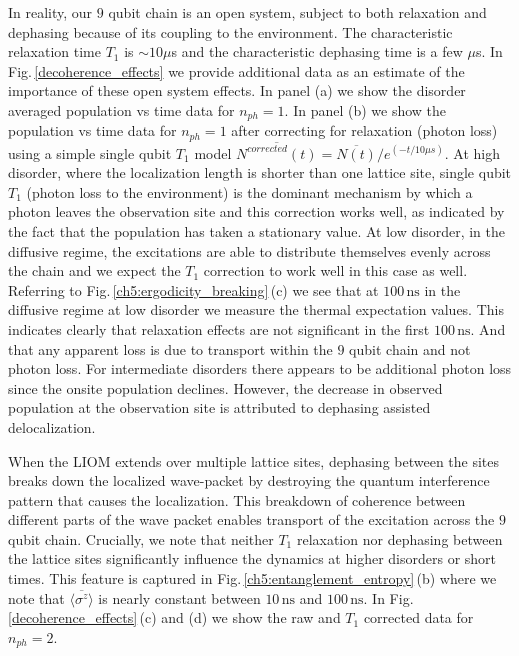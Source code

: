 In reality, our $9$ qubit chain is an open system, subject to both relaxation and dephasing because of its coupling to the environment.
The characteristic relaxation time $T_1$ is $\sim 10 \mu$s and the characteristic dephasing time is a few $\mu$s.
In Fig.\,\ref{decoherence_effects} we provide additional data as an estimate of the importance of these open system effects.
In panel (a) we show the disorder averaged population vs time data for $n_{ph}=1$.
In panel (b) we show the population vs time data for $n_{ph}=1$ after correcting for relaxation (photon loss) using a simple single qubit $T_1$ model
$\overline{N^{corrected} \left( t \right)} = \overline{N \left( t \right)} / e^{\left( -t/10 \mu s \right) }$.
%
At high disorder, where the localization length is shorter than one lattice site,
single qubit $T_1$ (photon loss to the environment) is the dominant mechanism by which a photon leaves the observation site and this correction works well,
as indicated by the fact that the population has taken a stationary value.
%
At low disorder, in the diffusive regime, the excitations are able to distribute themselves evenly across the chain and we expect the $T_1$ correction to work well in this case as well.
Referring to Fig.\,\ref{ch5:ergodicity_breaking}\,(c) we see that at $100 \, \text{ns}$ in the diffusive regime at low disorder we measure the thermal expectation values.
This indicates clearly that relaxation effects are not significant in the first $100 \, \text{ns}$.
And that any apparent loss is due to transport within the $9$ qubit chain and not photon loss.
%
For intermediate disorders there appears to be additional photon loss since the onsite population declines. However, the decrease in observed population at the observation site is attributed to dephasing assisted delocalization. \autocite{Znidaric2015, Levi2016, Fischer2016, Luschen2017, vanNieuwenburg2017}

When the LIOM extends over multiple lattice sites, dephasing between the sites breaks down the localized wave-packet by destroying the quantum interference pattern that causes the localization.
This breakdown of coherence between different parts of the wave packet enables transport of the excitation across the $9$ qubit chain.
Crucially, we note that neither $T_1$ relaxation nor dephasing between the lattice sites significantly influence the dynamics at higher disorders or short times.
This feature is captured in Fig.\,\ref{ch5:entanglement_entropy}\,(b) where we note that $\overline{ \langle \sigma^{z} \rangle }$ is nearly constant between $10 \, \text{ns}$ and $100 \, \text{ns}$.
In Fig.\,\ref{decoherence_effects}\,(c) and (d) we show the raw and $T_1$ corrected data for $n_{ph}=2$.

